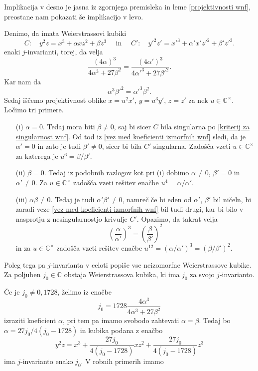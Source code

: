 \documentclass[mat1]{fmfdelo}
\numberwithin{equation}{section}
\newcommand{\C}{\mathbb C}
\newcommand{\CM}{\mathbb C ^\times}
\theoremstyle{definition}
\begin{document}
\begin{dokaz}
    Implikacija v desno je jasna iz zgornjega premisleka in leme \ref{projektivnosti wnf}, preostane nam pokazati še implikacijo v levo. 

    Denimo, da imata Weierstrassovi kubiki
    \[
        C: \quad y^2z = x^3 + \alpha xz^2 + \beta z^3 \quad \text{ in } \quad
        C': \quad y'^2z' = x'^3 + \alpha' x'z'^2 + \beta' z'^3. 
    \]
    enaki $j$-invarianti, torej, da velja
    \[
        \frac{(4\alpha)^3}{4\alpha^3 + 27\beta^2} = \frac{(4\alpha')^3}{4\alpha'^3 + 27\beta'^2}.
    \]
    Kar nam da
    \begin{equation}
        \label{vez med koeficienti izmorfnih wnf}
        \alpha^3 \beta'^2 = \alpha'^3 \beta^2.
    \end{equation}
    Sedaj iščemo projektivnost oblike $x = u^2 x'$, $y = u^3 y'$, $z = z'$ za nek $u \in \CM$. Ločimo tri primere.

    \begin{itemize}
        \item[(i)]
        $\alpha = 0$. Tedaj mora biti $\beta \neq 0$, saj bi sicer $C$ bila singularna po \ref{kriterij za singularnost wnf}. Od tod iz \eqref{vez med koeficienti izmorfnih wnf} sledi, da je $\alpha' = 0$ in zato je tudi $\beta' \neq 0$, sicer bi bila $C'$ singularna. Zadošča vzeti $u \in \CM$ za katerega je $u^6 = \beta/\beta'$.
        \item[(ii)]
        $\beta = 0$. Tedaj iz podobnih razlogov kot pri (i) dobimo $\alpha \neq 0$, $\beta' = 0$ in $\alpha' \neq 0$. Za $u \in \CM$ zadošča vzeti rešitev enačbe $u^4 = \alpha/\alpha'$.
        \item[(iii)]
        $\alpha\beta \neq 0$. Tedaj je tudi $\alpha'\beta' \neq 0$, namreč če bi eden od $\alpha'$, $\beta'$ bil ničeln, bi zaradi veze \ref{vez med koeficienti izmorfnih wnf} bil tudi drugi, kar bi bilo v nasprotju z nesingularnostjo krivulje $C'$. Opazimo, da takrat velja
        \[
            \left(\frac{\alpha}{\alpha'}\right)^3 = \left(\frac{\beta}{\beta'}\right)^2
        \]
        in za $u \in \CM$ zadošča vzeti rešitev enačbe $u^{12} = (\alpha/\alpha')^3 = (\beta/\beta')^2$.
    \end{itemize}
\end{dokaz}

Poleg tega pa $j$-invarianta v celoti popiše vse neizomorfne Weierstrassove kubike. Za poljuben $j_0 \in \C$ obstaja Weierstrassova kubika, ki ima $j_0$ za svojo $j$-invarianto.

Če je $j_0 \neq 0, 1728$, želimo iz enačbe
\[
    j_0 = 1728\frac{4\alpha^3}{4\alpha^3 + 27\beta^2}  
\]
izraziti koeficient $\alpha$, pri tem pa imamo svobodo zahtevati $\alpha = \beta$. Tedaj bo $\alpha = 27j_0/4(j_0 - 1728)$ in kubika podana z enačbo 
\[
  y^2z = x^3 + \frac{27j_0}{4(j_0 - 1728)}xz^2 + \frac{27j_0}{4(j_0 - 1728)}z^3
\] 
ima $j$-invarianto enako $j_0$. V robnih primerih imamo
\end{document}
